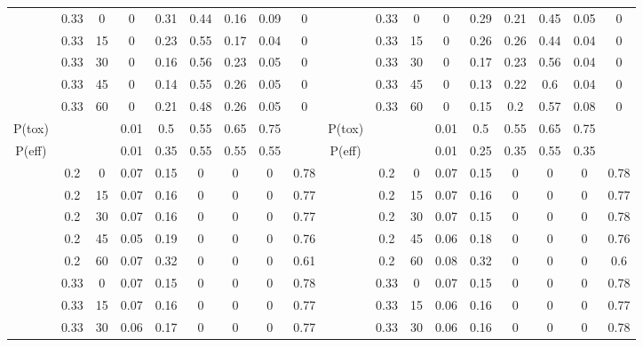 \begin{table}
{\begin{tabular}[t]{cccccccc>{}c|ccccccccc}
			& 0.33 & 0 & 0 & 0.31 & 0.44 & 0.16 & 0.09 & 0 &  & 0.33 & 0 & 0 & 0.29 & 0.21 & 0.45 & 0.05 & 0\\
			
			& 0.33 & 15 & 0 & 0.23 & 0.55 & 0.17 & 0.04 & 0 &  & 0.33 & 15 & 0 & 0.26 & 0.26 & 0.44 & 0.04 & 0\\
			
			& 0.33 & 30 & 0 & 0.16 & 0.56 & 0.23 & 0.05 & 0 &  & 0.33 & 30 & 0 & 0.17 & 0.23 & 0.56 & 0.04 & 0\\
			
			& 0.33 & 45 & 0 & 0.14 & 0.55 & 0.26 & 0.05 & 0 &  & 0.33 & 45 & 0 & 0.13 & 0.22 & 0.6 & 0.04 & 0\\
			
			\multirow{-10}{*}{\centering\arraybackslash 5} & 0.33 & 60 & 0 & 0.21 & 0.48 & 0.26 & 0.05 & 0 & \multirow{-10}{*}{\centering\arraybackslash 11} & 0.33 & 60 & 0 & 0.15 & 0.2 & 0.57 & 0.08 & 0\\
			\cmidrule{1-18}
			P(tox) &  &  & 0.01 & 0.5 & 0.55 & 0.65 & 0.75 &  & P(tox) &  &  & 0.01 & 0.5 & 0.55 & 0.65 & 0.75 & \\
			\cmidrule{1-18}
			P(eff) &  &  & 0.01 & 0.35 & 0.55 & 0.55 & 0.55 &  & P(eff) &  &  & 0.01 & 0.25 & 0.35 & 0.55 & 0.35 & \\
			\cmidrule{1-18}
			& 0.2 & 0 & 0.07 & 0.15 & 0 & 0 & 0 & 0.78 &  & 0.2 & 0 & 0.07 & 0.15 & 0 & 0 & 0 & 0.78\\
			
			& 0.2 & 15 & 0.07 & 0.16 & 0 & 0 & 0 & 0.77 &  & 0.2 & 15 & 0.07 & 0.16 & 0 & 0 & 0 & 0.77\\
			
			& 0.2 & 30 & 0.07 & 0.16 & 0 & 0 & 0 & 0.77 &  & 0.2 & 30 & 0.07 & 0.15 & 0 & 0 & 0 & 0.78\\
			
			& 0.2 & 45 & 0.05 & 0.19 & 0 & 0 & 0 & 0.76 &  & 0.2 & 45 & 0.06 & 0.18 & 0 & 0 & 0 & 0.76\\
			
			& 0.2 & 60 & 0.07 & 0.32 & 0 & 0 & 0 & 0.61 &  & 0.2 & 60 & 0.08 & 0.32 & 0 & 0 & 0 & 0.6\\
			
			& 0.33 & 0 & 0.07 & 0.15 & 0 & 0 & 0 & 0.78 &  & 0.33 & 0 & 0.07 & 0.15 & 0 & 0 & 0 & 0.78\\
			
			& 0.33 & 15 & 0.07 & 0.16 & 0 & 0 & 0 & 0.77 &  & 0.33 & 15 & 0.06 & 0.16 & 0 & 0 & 0 & 0.77\\
			
			& 0.33 & 30 & 0.06 & 0.17 & 0 & 0 & 0 & 0.77 &  & 0.33 & 30 & 0.06 & 0.16 & 0 & 0 & 0 & 0.78\\
			

\end{tabular}}
\end{table}
